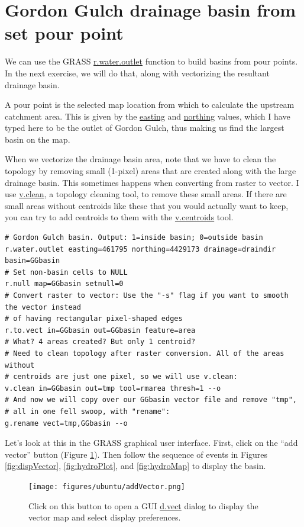 \documentclass{book}
\begin{document}
\section{Gordon Gulch drainage basin from set pour point \label{s:GGbasin}}

We can use the GRASS \url{r.water.outlet} function to build basins from pour points. In the next exercise, we will do that, along with vectorizing the resultant drainage basin.

A pour point is the selected map location from which to calculate the upstream catchment area. This is given by the \url{easting} and \url{northing} values, which I have typed here to be the outlet of Gordon Gulch, thus making us find the largest basin on the map.

When we vectorize the drainage basin area, note that we have to clean the topology by removing small (1-pixel) areas that are created along with the large drainage basin. This sometimes happens when converting from raster to vector. I use \url{v.clean}, a topology cleaning tool, to remove these small areas. If there are small areas without centroids like these that you would actually want to keep, you can try to add centroids to them with the \url{v.centroids} tool.

\begin{lstlisting}
# Gordon Gulch basin. Output: 1=inside basin; 0=outside basin
r.water.outlet easting=461795 northing=4429173 drainage=draindir basin=GGbasin
# Set non-basin cells to NULL
r.null map=GGbasin setnull=0
# Convert raster to vector: Use the "-s" flag if you want to smooth the vector instead
# of having rectangular pixel-shaped edges
r.to.vect in=GGbasin out=GGbasin feature=area
# What? 4 areas created? But only 1 centroid?
# Need to clean topology after raster conversion. All of the areas without
# centroids are just one pixel, so we will use v.clean:
v.clean in=GGbasin out=tmp tool=rmarea thresh=1 --o
# And now we will copy over our GGbasin vector file and remove "tmp",
# all in one fell swoop, with "rename":
g.rename vect=tmp,GGbasin --o
\end{lstlisting}

Let's look at this in the GRASS graphical user interface. First, click on the ``add vector'' button (Figure \ref{fig:addVector}). Then follow the sequence of events in Figures \ref{fig:dispVector}, \ref{fig:hydroPlot}, and \ref{fig:hydroMap} to display the basin.

\begin{figure}[h]
 \begin{center}
 \texttt{[image: figures/ubuntu/addVector.png]}
 \caption{Click on this button to open a GUI \protect\url{d.vect} dialog to display the vector map and select display preferences.}
 \label{fig:addVector}
 \end{center}
\end{figure}
\end{document}
